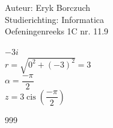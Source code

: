 \documentclass[a4paper]{article}
\begin{document}
  
\noindent \large Auteur: Eryk Borczuch \\
\noindent \large Studierichting: Informatica\\
\noindent \large Oefeningenreeks 1C nr. 11.9\\

\medskip

\normalsize

$-3i$\\

$r = \sqrt{0^2+(-3)^2} = 3$\\

$\alpha = \dfrac{-\pi}{2}$\\

$z = 3 \operatorname{cis} \left(\dfrac{-\pi}{2} \right)$




\begin{thebibliography}{999}
\end{thebibliography}
\end{document}
